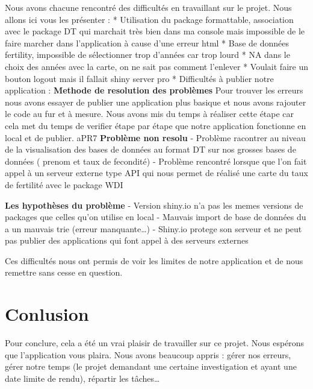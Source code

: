 \documentclass[
]{article}
\begin{document}
Nous avons chacune rencontré des difficultés en travaillant sur le
projet. Nous allons ici vous les présenter : * Utilisation du package
formattable, association avec le package DT qui marchait très bien dans
ma console mais impossible de le faire marcher dans l'application à
cause d'une erreur html * Base de données fertility, impossible de
sélectionner trop d'années car trop lourd * NA dans le choix des années
avec la carte, on ne sait pas comment l'enlever * Voulait faire un
bouton logout mais il fallait shiny server pro * Difficultés à publier
notre application : \textbf{Methode de resolution des problèmes} Pour
trouver les erreurs nous avons essayer de publier une application plus
basique et nous avons rajouter le code au fur et à mesure. Nous avons
mis du temps à réaliser cette étape car cela met du temps de verifier
étape par étape que notre application fonctionne en local et de publier.
aPR7 \textbf{Problème non resolu} - Problème racontrer au niveau de la
visualisation des bases de données au format DT sur nos grosses bases de
données ( prenom et taux de fecondité) - Problème rencontré lorsque que
l'on fait appel à un serveur externe type API qui nous permet de réalisé
une carte du taux de fertilité avec le package WDI

\textbf{Les hypothèses du problème} - Version shiny.io n'a pas les memes
versions de packages que celles qu'on utilise en local - Mauvais import
de base de données du a un mauvais trie (erreur manquante\ldots) -
Shiny.io protege son serveur et ne peut pas publier des applications qui
font appel à des serveurs externes

Ces difficultés nous ont permis de voir les limites de notre application
et de nous remettre sans cesse en question.

\hypertarget{conlusion}{%
\section{Conlusion}\label{conlusion}}

Pour conclure, cela a été un vrai plaisir de travailler sur ce projet.
Nous espérons que l'application vous plaira. Nous avons beaucoup appris
: gérer nos erreurs, gérer notre temps (le projet demandant une certaine
investigation et ayant une date limite de rendu), répartir les
tâches\ldots{}
\end{document}
